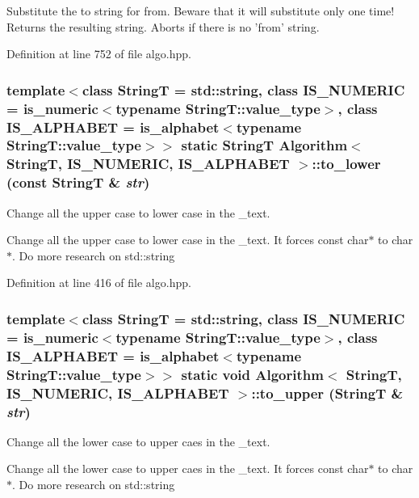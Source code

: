 Substitute the to string for from. Beware that it will substitute only one time! Returns the resulting string. Aborts if there is no 'from' string. 

Definition at line 752 of file algo.hpp.\hypertarget{classAlgorithm_617415dba55cc4533e4776760178032b}{
\subsubsection[{to\_\-lower}]{\setlength{\rightskip}{0pt plus 5cm}template$<$class StringT  = std::string, class IS\_\-NUMERIC  = is\_\-numeric$<$typename StringT::value\_\-type$>$, class IS\_\-ALPHABET  = is\_\-alphabet$<$typename StringT::value\_\-type$>$$>$ static StringT {\bf Algorithm}$<$ StringT, IS\_\-NUMERIC, IS\_\-ALPHABET $>$::to\_\-lower (const StringT \& {\em str})}}
\label{classAlgorithm_617415dba55cc4533e4776760178032b}


Change all the upper case to lower case in the \_\-text. 

Change all the upper case to lower case in the \_\-text. It forces const char$\ast$ to char$\ast$. Do more research on std::string 

Definition at line 416 of file algo.hpp.\hypertarget{classAlgorithm_42e06428b21a425ac2da8d60313ab9a9}{
\subsubsection[{to\_\-upper}]{\setlength{\rightskip}{0pt plus 5cm}template$<$class StringT  = std::string, class IS\_\-NUMERIC  = is\_\-numeric$<$typename StringT::value\_\-type$>$, class IS\_\-ALPHABET  = is\_\-alphabet$<$typename StringT::value\_\-type$>$$>$ static void {\bf Algorithm}$<$ StringT, IS\_\-NUMERIC, IS\_\-ALPHABET $>$::to\_\-upper (StringT \& {\em str})}}
\label{classAlgorithm_42e06428b21a425ac2da8d60313ab9a9}


Change all the lower case to upper caes in the \_\-text. 

Change all the lower case to upper caes in the \_\-text. It forces const char$\ast$ to char$\ast$. Do more research on std::string 

